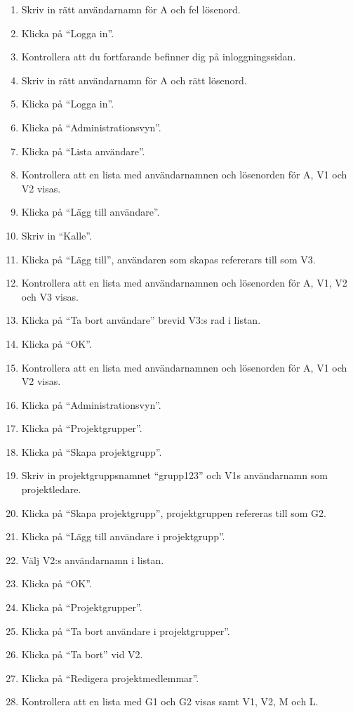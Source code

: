 \documentclass[a4paper]{article}
\begin{document}
\begin{FT}
\begin{enumerate}
\item Skriv in rätt användarnamn för A och fel lösenord.
\item Klicka på ``Logga in''.
\item Kontrollera att du fortfarande befinner dig på inloggningssidan.
\item Skriv in rätt användarnamn för A och rätt lösenord.
\item Klicka på ``Logga in''.
\item Klicka på ``Administrationsvyn''.
\item Klicka på ``Lista användare''.
\item Kontrollera att en lista med användarnamnen och lösenorden för A, V1 och V2 visas.
\item Klicka på ``Lägg till användare''.
\item Skriv in ``Kalle''.
\item Klicka på ``Lägg till'', användaren som skapas refererars till som V3.
\item Kontrollera att en lista med användarnamnen och lösenorden för A, V1, V2 och V3 visas.
\item Klicka på ``Ta bort användare'' brevid V3:s rad i listan.
\item Klicka på ``OK''.
\item Kontrollera att en lista med användarnamnen och lösenorden för A, V1 och V2 visas.
\item Klicka på ``Administrationsvyn''.
\item Klicka på ``Projektgrupper''.
\item Klicka på ``Skapa projektgrupp''.
\item Skriv in projektgruppsnamnet ``grupp123'' och V1s användarnamn som projektledare.
\item Klicka på ``Skapa projektgrupp'', projektgruppen refereras till som G2.
\item Klicka på ``Lägg till användare i projektgrupp''.
\item Välj V2:s användarnamn i listan.
\item Klicka på ``OK''.
\item Klicka på ``Projektgrupper''. %
\item Klicka på ``Ta bort användare i projektgrupper''.
\item Klicka på ``Ta bort'' vid V2.
\item Klicka på ``Redigera projektmedlemmar''.
\item Kontrollera att en lista med G1 och G2 visas samt V1, V2, M och L.

\end{enumerate}
\end{FT}
\end{document}
